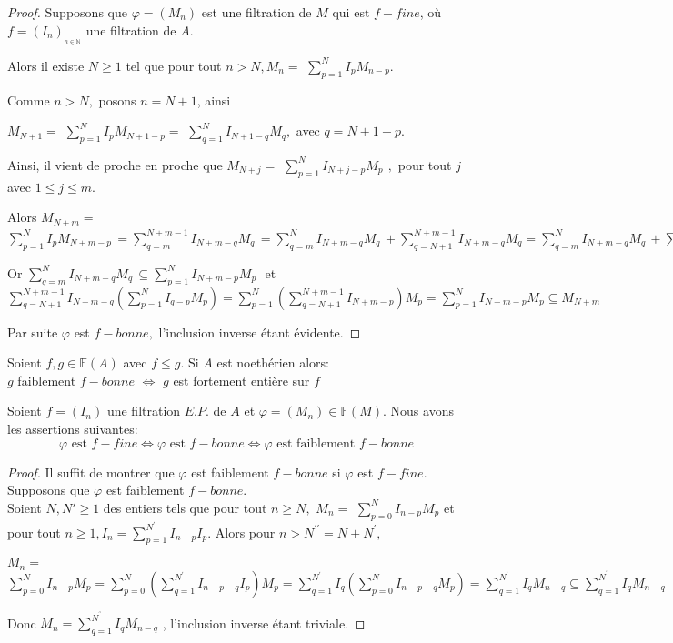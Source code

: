 \begin{proof}
	Supposons que $\varphi =(M_{n})$ est une filtration de $M$ qui est $f-fine$,
	où $f=(I_{n})_{_{n\in \mathbb{N}}}$ une filtration de $A.$
	
	Alors il existe $N\geq 1$ tel que pour tout $n>N,M_{n}=$ $%
	\sum\limits_{p=1}^{N}I_{p}M_{n-p}.$
	
	Comme $n>N,$ posons $n=N+1$, ainsi
	
	$M_{N+1}=$ $\sum\limits_{p=1}^{N}I_{p}M_{N+1-p}=$ $\sum\limits_{q=1}^{N}I_{N+1-q}M_{q},$ avec $q=N+1-p.$
	
	Ainsi, il vient de proche en proche que $M_{N+j}=$  $\sum\limits_{p=1}^{N}I_{N+j-p}M_{p}\,\ ,$ pour tout $j$ avec $1\leq j\leq m.$
	
	Alors $M_{N+m}=$ $\sum\limits_{p=1}^{N}I_{p}M_{N+m-p}\,=\sum\limits_{q=m}^{N+m-1}I_{N+m-q}M_{q}\,=\sum\limits_{q=m}^{N}I_{N+m-q}M_{q}\,+\sum\limits_{q=N+1}^{N+m-1}I_{N+m-q}M_{q}=\sum\limits_{q=m}^{N}I_{N+m-q}M_{q}\,+\sum\limits_{q=N+1}^{N+m-1}I_{N+m-q}(\sum\limits_{p=1}^{N}I_{q-p}M_{p}).$
	
	Or $\sum\limits_{q=m}^{N}I_{N+m-q}M_{q}\,\subseteq
	\sum\limits_{p=1}^{N}I_{N+m-p}M_{p}\,$\ et $\sum\limits_{q=N+1}^{N+m-1}I_{N+m-q}(\sum\limits_{p=1}^{N}I_{q-p}M_{p})=\sum\limits_{p=1}^{N}(\sum\limits_{q=N+1}^{N+m-1}I_{N+m-p})M_{p}=\sum\limits_{p=1}^{N}I_{N+m-p}M_{p}\subseteq M_{N+m}$
	
	Par suite $\varphi $ est $f-bonne,$ l'inclusion inverse étant évidente.
\end{proof}
\begin{moncorollaire}
	\label{maprop8}
	Soient $f,g \in \mathbb{F}(A)$ avec $f \leqslant g$. Si $A$ est noethérien alors:\\ 
	$g$ faiblement $f-bonne$ $\Longleftrightarrow$ $g$ est fortement entière sur $f$
\end{moncorollaire}
\begin{maproposition}
	Soient $f=(I_n)$ une filtration $E.P.$ de $A$ et $\varphi=(M_n) \in \mathbb{F}(M)$. Nous avons les assertions suivantes:
	\[ \varphi \text{ est } f-fine \Longleftrightarrow \varphi \text{ est } f-bonne \Longleftrightarrow \varphi \text{ est faiblement } f-bonne   \]
\end{maproposition}
\begin{proof}
	Il suffit de montrer que $\varphi$ est faiblement $f-bonne$ si $\varphi$ est $f-fine$.\\ Supposons que $\varphi$ est faiblement $f-bonne$.\\
	Soient $N, N' \geqslant 1$ des entiers tels que pour tout $n \geqslant N,$
	$M_{n}=$ $\sum\limits_{p=0}^{N}I_{n-p}M_{p}$ et pour tout $n\geq
	1,I_{n}=\sum\limits_{p=1}^{N^{\prime }}I_{n-p}I_{p}.$ Alors pour $n>N^{\prime \prime }=N+N^{\prime},$
	
	$M_{n}=$ $\sum\limits_{p=0}^{N}I_{n-p}M_{p}=\sum\limits_{p=0}^{N}(%
	\sum\limits_{q=1}^{N^{\prime
	}}I_{n-p-q}I_{p})M_{p}=\sum\limits_{q=1}^{N^{\prime
	}}I_{q}(\sum\limits_{p=0}^{N}I_{n-p-q}M_{p})=\sum\limits_{q=1}^{N^{\prime
	}}I_{q}M_{n-q}\subseteq \sum\limits_{q=1}^{N^{^{\prime \prime }}}I_{q}M_{n-q}
	$
	
	Donc $M_{n}=\sum\limits_{q=1}^{N^{^{\prime \prime }}}I_{q}M_{n-q}$ ,
	l'inclusion inverse étant triviale. 
\end{proof}
